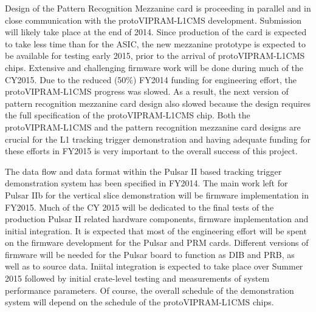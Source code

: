Design of the Pattern Recognition Mezzanine card is proceeding in parallel and in close communication with the protoVIPRAM-L1CMS development. Submission will likely take place at the end of 2014.  Since production of the card is expected to take less time than for the ASIC, the new mezzanine prototype is expected to be available for testing early 2015, prior to the arrival of protoVIPRAM-L1CMS chips. Extensive and challenging firmware work will be done during much of the CY2015. Due to the reduced (50\%) FY2014 funding for engineering effort, the protoVIPRAM-L1CMS progress was slowed. As a result, the next version of pattern recognition mezzanine card design also slowed because the design requires the full specification of the protoVIPRAM-L1CMS chip. Both the protoVIPRAM-L1CMS and the pattern recognition mezzanine card designs are crucial for the L1 tracking trigger demonstration and having adequate funding for these efforts in FY2015 is very important to the overall success of this project. 

The data flow and data format within the Pulsar II based tracking trigger demonstration system has been specified in FY2014. The main work left for Pulsar IIb for the vertical slice demonstration will be firmware implementation in FY2015. Much of the CY 2015 will be dedicated to the final tests of the production Pulsar II related hardware components, firmware implementation and initial integration. It is expected that most of the engineering effort will be spent on the firmware development for the Pulsar and  PRM cards. Different versions of firmware will be needed for the Pulsar board to function as DIB and PRB, as well as to source data. Iniital integration is expected to take place over Summer 2015 followed by initial crate-level testing and 
measurements of system performance parameters. Of course, the overall schedule of the demonstration system will depend on the schedule of the protoVIPRAM-L1CMS chips. 

